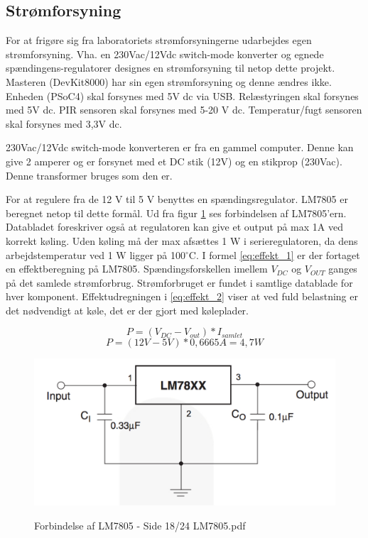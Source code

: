 \subsection{Strømforsyning}

For at frigøre sig fra laboratoriets strømforsyningerne udarbejdes egen strømforsyning. Vha. en 230Vac/12Vdc switch-mode konverter og egnede spændingens-regulatorer designes en strømforsyning til netop dette projekt. Masteren (DevKit8000) har sin egen strømforsyning og denne ændres ikke. Enheden (PSoC4) skal forsynes med 5V dc via USB. Relæstyringen skal forsynes med 5V dc. PIR sensoren skal forsynes med 5-20 V dc. Temperatur/fugt sensoren skal forsynes med 3,3V dc. 

230Vac/12Vdc switch-mode konverteren er fra en gammel computer. Denne kan give 2 amperer og er forsynet med et DC stik (12V) og en stikprop (230Vac). Denne transformer bruges som den er. 

For at regulere fra de 12 V til 5 V benyttes en spændingsregulator. LM7805 er beregnet netop til dette formål. Ud fra figur \ref{lab:LM7805} ses forbindelsen af LM7805'ern. Databladet foreskriver også at regulatoren kan give et output på max 1A ved korrekt køling.  
\newline
Uden køling må der max afsættes 1 W i serieregulatoren, da dens arbejdstemperatur ved 1 W ligger på 100$^{\circ}$C.  I formel \ref{eq:effekt_1} er der fortaget en effektberegning på LM7805. Spændingsforskellen imellem $V_{DC}$ og $V_{OUT}$ ganges på det samlede strømforbrug. Strømforbruget er fundet i samtlige datablade for hver komponent. Effektudregningen i \ref{eq:effekt_2} viser at ved fuld belastning er det nødvendigt at køle, det er der gjort med køleplader. 

\begin{equation} 
P = (V_{DC}-V_{out})*I_{samlet} 
\label{eq:effekt_1}
\end{equation}
\begin{equation} 
P = (12V - 5V)*0,6665 A= 4,7 W 
\label{eq:effekt_2}
\end{equation}

\begin{figure}[H] \centering
{\includegraphics[width=\textwidth]{filer/design/Billeder/LM7805_DATASHEET}}
\caption{Forbindelse af LM7805 - Side 18/24 LM7805.pdf}
\label{lab:LM7805}
\raggedright
\end{figure}

